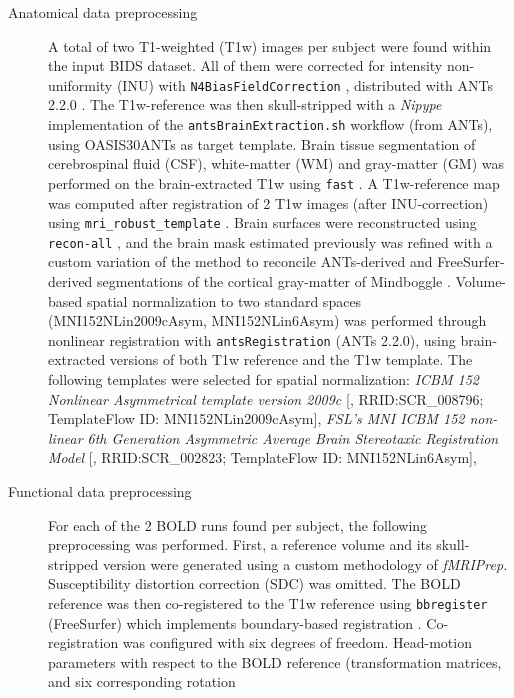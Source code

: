 \begin{description}
\item[Anatomical data preprocessing]
A total of two T1-weighted (T1w) images per subject were found within the input BIDS
dataset. All of them were corrected for intensity non-uniformity (INU)
with \texttt{N4BiasFieldCorrection} \citep{n4}, distributed with ANTs
2.2.0 \citep[RRID:SCR\_004757]{ants}. The T1w-reference was then
skull-stripped with a \emph{Nipype} implementation of the
\texttt{antsBrainExtraction.sh} workflow (from ANTs), using OASIS30ANTs
as target template. Brain tissue segmentation of cerebrospinal fluid
(CSF), white-matter (WM) and gray-matter (GM) was performed on the
brain-extracted T1w using \texttt{fast} \citep[FSL 5.0.9,
RRID:SCR\_002823,][]{fsl_fast}. A T1w-reference map was computed after
registration of 2 T1w images (after INU-correction) using
\texttt{mri\_robust\_template} \citep[FreeSurfer 6.0.1,][]{fs_template}.
Brain surfaces were reconstructed using \texttt{recon-all}
\citep[FreeSurfer 6.0.1, RRID:SCR\_001847,][]{fs_reconall}, and the
brain mask estimated previously was refined with a custom variation of
the method to reconcile ANTs-derived and FreeSurfer-derived
segmentations of the cortical gray-matter of Mindboggle
\citep[RRID:SCR\_002438,][]{mindboggle}. Volume-based spatial
normalization to two standard spaces (MNI152NLin2009cAsym,
MNI152NLin6Asym) was performed through nonlinear registration with
\texttt{antsRegistration} (ANTs 2.2.0), using brain-extracted versions
of both T1w reference and the T1w template. The following templates were
selected for spatial normalization: \emph{ICBM 152 Nonlinear
Asymmetrical template version 2009c} {[}\citep{mni152nlin2009casym},
RRID:SCR\_008796; TemplateFlow ID: MNI152NLin2009cAsym{]}, \emph{FSL's
MNI ICBM 152 non-linear 6th Generation Asymmetric Average Brain
Stereotaxic Registration Model} {[}\citep{mni152nlin6asym},
RRID:SCR\_002823; TemplateFlow ID: MNI152NLin6Asym{]},
\item[Functional data preprocessing]
For each of the 2 BOLD runs found per subject, the following preprocessing was performed. First, a reference
volume and its skull-stripped version were generated using a custom
methodology of \emph{fMRIPrep}. Susceptibility distortion correction
(SDC) was omitted. The BOLD reference was then co-registered to the T1w
reference using \texttt{bbregister} (FreeSurfer) which implements
boundary-based registration \citep{bbr}. Co-registration was configured
with six degrees of freedom. Head-motion parameters with respect to the
BOLD reference (transformation matrices, and six corresponding rotation

\end{description}
